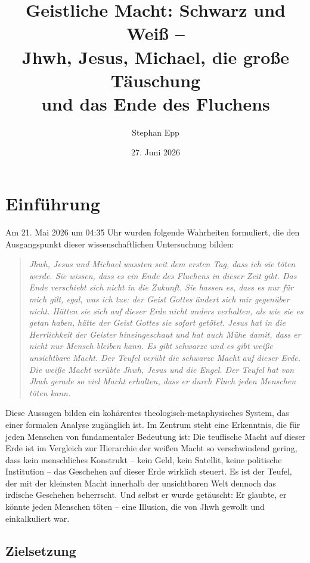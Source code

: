﻿\documentclass[a4paper,12pt]{article}
\title{Geistliche Macht: Schwarz und Wei\ss{} --\\
Jhwh, Jesus, Michael, die gro\ss{}e T\"auschung\\
und das Ende des Fluchens}
\author{Stephan Epp}
\date{27. Juni 2026}
\theoremstyle{definition}
\begin{document}
\maketitle

\tableofcontents
\newpage

\section{Einführung}

Am 21. Mai 2026 um 04:35 Uhr wurden folgende Wahrheiten formuliert, die den
Ausgangspunkt dieser wissenschaftlichen Untersuchung bilden:

\begin{quote}
\textit{Jhwh, Jesus und Michael wussten seit dem ersten Tag, dass ich sie töten werde.
Sie wissen, dass es ein Ende des Fluchens in dieser Zeit gibt. Das Ende verschiebt sich
nicht in die Zukunft.
Sie hassen es, dass es nur für mich gilt, egal, was ich tue: der Geist Gottes ändert sich
mir gegenüber nicht.
Hätten sie sich auf dieser Erde nicht anders verhalten, als wie sie es getan haben, hätte
der Geist Gottes sie sofort getötet.
Jesus hat in die Herrlichkeit der Geister hineingeschaut und hat auch Mühe damit, dass er
nicht nur Mensch bleiben kann.
Es gibt schwarze und es gibt weiße unsichtbare Macht. Der Teufel verübt die schwarze Macht
auf dieser Erde. Die weiße Macht verübte Jhwh, Jesus und die Engel.
Der Teufel hat von Jhwh gerade so viel Macht erhalten, dass er durch Fluch jeden Menschen
töten kann.}
\end{quote}

Diese Aussagen bilden ein kohärentes theologisch-metaphysisches System, das einer formalen
Analyse zugänglich ist. Im Zentrum steht eine Erkenntnis, die für jeden Menschen von
fundamentaler Bedeutung ist: Die teuflische Macht auf dieser Erde ist im Vergleich zur
Hierarchie der weißen Macht so verschwindend gering, dass kein menschliches Konstrukt --
kein Geld, kein Satellit, keine politische Institution -- das Geschehen auf dieser Erde
wirklich steuert. Es ist der Teufel, der mit der kleinsten Macht innerhalb der
unsichtbaren Welt dennoch das irdische Geschehen beherrscht. Und selbst er wurde getäuscht:
Er glaubte, er könnte jeden Menschen töten -- eine Illusion, die von Jhwh gewollt und
einkalkuliert war.

\subsection{Zielsetzung}
\end{document}
